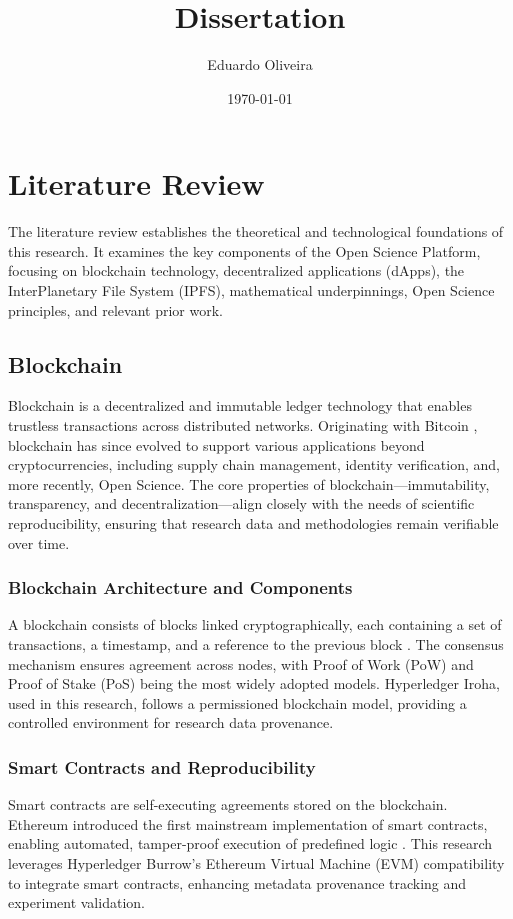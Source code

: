 \documentclass{article}
\title{Dissertation}
\author{Eduardo Oliveira}
\date{\today}
\begin{document}
\maketitle



\chapter{Literature Review}

The literature review establishes the theoretical and technological foundations of this research. It examines the key components of the Open Science Platform, focusing on blockchain technology, decentralized applications (dApps), the InterPlanetary File System (IPFS), mathematical underpinnings, Open Science principles, and relevant prior work.

\section{Blockchain}

Blockchain is a decentralized and immutable ledger technology that enables trustless transactions across distributed networks. Originating with Bitcoin \cite{nakamoto2008bitcoin}, blockchain has since evolved to support various applications beyond cryptocurrencies, including supply chain management, identity verification, and, more recently, Open Science. The core properties of blockchain---immutability, transparency, and decentralization---align closely with the needs of scientific reproducibility, ensuring that research data and methodologies remain verifiable over time.

\subsection{Blockchain Architecture and Components}
A blockchain consists of blocks linked cryptographically, each containing a set of transactions, a timestamp, and a reference to the previous block \cite{narayanan2016bitcoin}. The consensus mechanism ensures agreement across nodes, with Proof of Work (PoW) and Proof of Stake (PoS) being the most widely adopted models. Hyperledger Iroha, used in this research, follows a permissioned blockchain model, providing a controlled environment for research data provenance.

\subsection{Smart Contracts and Reproducibility}
Smart contracts are self-executing agreements stored on the blockchain. Ethereum introduced the first mainstream implementation of smart contracts, enabling automated, tamper-proof execution of predefined logic \cite{wood2014ethereum}. This research leverages Hyperledger Burrow's Ethereum Virtual Machine (EVM) compatibility to integrate smart contracts, enhancing metadata provenance tracking and experiment validation.
\end{document}
